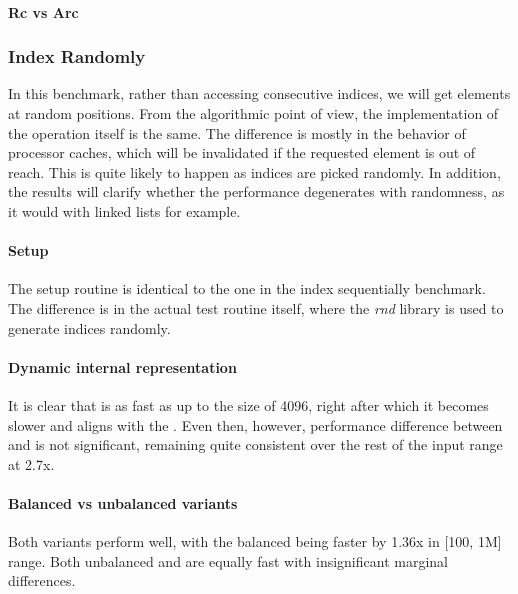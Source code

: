 
\paragraph*{Rc vs Arc}

\subsubsection*{Index Randomly}
In this benchmark, rather than accessing consecutive indices, we will get elements at random positions. From the algorithmic point of view, the implementation of the operation itself is the same. The difference is mostly in the behavior of processor caches, which will be invalidated if the requested element is out of reach. This is quite likely to happen as indices are picked randomly. In addition, the results will clarify whether the performance degenerates with randomness, as it would with linked lists for example. 

\paragraph*{Setup}
The setup routine is identical to the one in the index sequentially benchmark. The difference is in the actual test routine itself, where the  \emph{rnd} library is used to generate indices randomly. 

\paragraph*{Dynamic internal representation}
It is clear that \pvec{} is as fast as \stdvec{} up to the size of 4096, right after which it becomes slower and aligns with the \rrbvec{}. Even then, however, performance difference between \stdvec{} and \pvec{} is not significant, remaining quite consistent over the rest of the input range at 2.7x. 

\paragraph*{Balanced vs unbalanced variants}
Both variants perform well, with the balanced \rrbvec{} being faster by 1.36x in [100, 1M] range. Both unbalanced \rrbvec{} and \imrsvec{} are equally fast with insignificant marginal differences.

